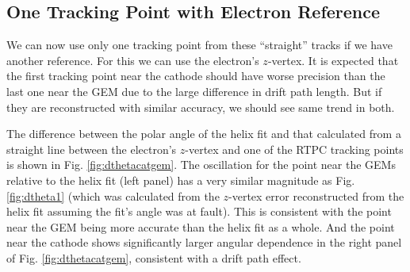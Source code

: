 \documentclass[amsmath,amssymb,notitlepage,11pt]{revtex4-1}
\begin{document}
\subsection{One Tracking Point with Electron Reference}
We can now use only one tracking point from these ``straight'' tracks if we have another reference.  For this we can use the electron's $z$-vertex.
It is expected that the first tracking point near the cathode should have worse precision than the last one near the GEM due to the large difference in drift path length.
But if they are reconstructed with similar accuracy, we should see same trend in both.%

The difference between the polar angle of the helix fit and that calculated from a straight line between the electron's $z$-vertex and one of the RTPC tracking points is shown in Fig. \ref{fig:dthetacatgem}.
The oscillation for the point near the GEMs relative to the helix fit (left panel) has a very similar magnitude as Fig. \ref{fig:dtheta1} (which was calculated from the $z$-vertex error reconstructed from the helix fit assuming the fit's angle was at fault).  This is consistent with the point near the GEM being more accurate than the helix fit as a whole.  And the point near the cathode shows significantly larger angular dependence in the right panel of Fig. \ref{fig:dthetacatgem}, consistent with a drift path effect.

\end{document}
